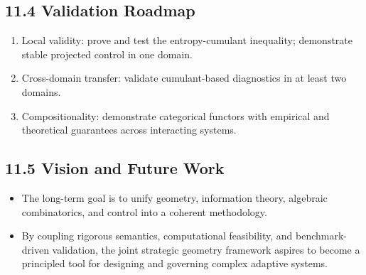 \subsection*{11.4 \quad Validation Roadmap}
\begin{enumerate}
    \item Local validity: prove and test the entropy-cumulant inequality; demonstrate stable projected control in one domain.
    \item Cross-domain transfer: validate cumulant-based diagnostics in at least two domains.
    \item Compositionality: demonstrate categorical functors with empirical and theoretical guarantees across interacting systems.
\end{enumerate}

\subsection*{11.5 \quad Vision and Future Work}
\begin{itemize}
    \item The long-term goal is to unify geometry, information theory, algebraic combinatorics, and control into a coherent methodology.
    \item By coupling rigorous semantics, computational feasibility, and benchmark-driven validation, the joint strategic geometry framework aspires to become a principled tool for designing and governing complex adaptive systems.
\end{itemize}

\appendix
